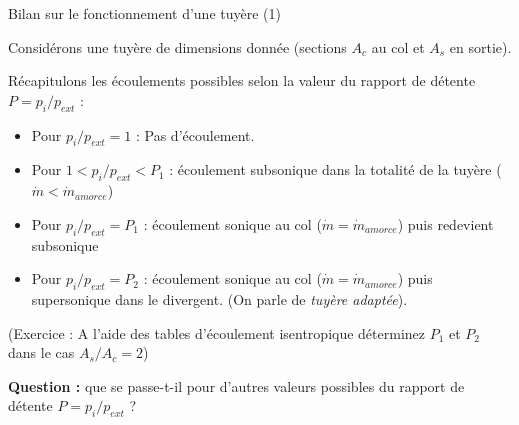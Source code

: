 \begin{frame}{Bilan sur le fonctionnement d'une tuyère (1)}


\small
Considérons une tuyère de dimensions donnée (sections $A_c$ au col et $A_s$ en sortie). 

Récapitulons les écoulements possibles selon la valeur du rapport de détente $ P = p_i/p_{ext}$ :

\pause
\begin{itemize}

\item  Pour $p_i/p_{ext} = 1 $ :  Pas d'écoulement. 

 \pause 
\item Pour $1 < p_i/p_{ext} < P_1  $ : écoulement subsonique dans la totalité de la tuyère ($\dot m < {\dot m}_{amorce}$)

 \pause 
\item Pour $p_i/p_{ext} = P_1 $ : écoulement sonique au col ($\dot m = {\dot m}_{amorce}$) puis redevient subsonique 
 
 \pause 
\item Pour $p_i /p_{ext} = P_2$ : écoulement sonique au col ($\dot m = {\dot m}_{amorce}$)  puis supersonique dans le divergent.
(On parle de {\em tuyère adaptée}).

\end{itemize}
 
 \pause 
 \smallskip
 (Exercice : A l'aide des tables d'écoulement isentropique déterminez $P_1$ et $P_2$ dans le cas $A_s/A_c = 2$)
 
 
 
 
 {\bf Question :} que se passe-t-il pour d'autres valeurs possibles  du rapport de détente $ P = p_i/p_{ext}$ ?
 
\end{frame}

